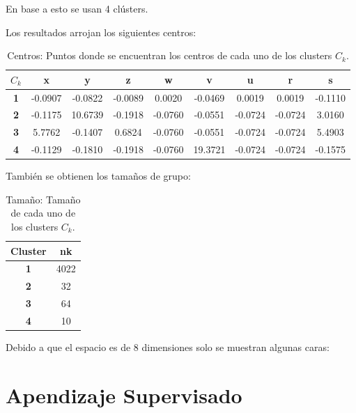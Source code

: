 \documentclass[12pt]{article}
\begin{document}
En base a esto se usan 4 clústers.

Los resultados arrojan los siguientes centros:

\begin{table}[h]\centering
\caption{Centros: Puntos donde se encuentran los centros de cada uno de los clusters $C_k$.}

\begin{tabular}{ccccccccc}
\hline
\textbf{$C_k$} & \textbf{x} & \textbf{y} & \textbf{z} & \textbf{w} & \textbf{v} & \textbf{u} & \textbf{r} & \textbf{s} \\ \hline
\textbf{1}       & -0.0907  & -0.0822  & -0.0089  & 0.0020   & -0.0469  & 0.0019   & 0.0019   & -0.1110  \\
\textbf{2}       & -0.1175  & 10.6739  & -0.1918  & -0.0760  & -0.0551  & -0.0724  & -0.0724  & 3.0160   \\
\textbf{3}       & 5.7762   & -0.1407  & 0.6824   & -0.0760  & -0.0551  & -0.0724  & -0.0724  & 5.4903   \\
\textbf{4}       & -0.1129  & -0.1810  & -0.1918  & -0.0760  & 19.3721  & -0.0724  & -0.0724  & -0.1575  \\ \hline
\end{tabular}
\end{table}

También se obtienen los tamaños de grupo:

\begin{table}[h]\centering
\caption{Tamaño: Tamaño de cada uno de los clusters $C_k$.}
\begin{tabular}{cc}
\hline
\textbf{Cluster} & \textbf{nk} \\ \hline
\textbf{1}       & 4022        \\
\textbf{2}       & 32          \\
\textbf{3}       & 64          \\
\textbf{4}       & 10          \\ \hline
\end{tabular}
\end{table}

Debido a que el espacio es de 8 dimensiones solo se muestran algunas caras:





\section{Apendizaje Supervisado}
\end{document}
